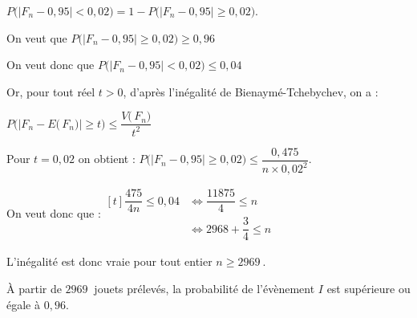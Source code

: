 \documentclass[10pt]{article}
\providecommand{\np}[2][]{{#2~#1}}
\begin{document}
\begin{enumerate}
\begin{enumerate}
$P\Big(\big|F_n - 0,95 \big| < 0,02\Big) = 1 - P\Big(\big|F_{n} - 0,95 \big| \geqslant 0,02\Big)$.

On veut que $P\Big(\big|F_{n} - 0,95 \big| \geqslant 0,02\Big) \geqslant 0,96$

On veut donc que $P\Big(\big|F_n - 0,95 \big| < 0,02\Big) \leqslant 0,04$

Or, pour tout réel $t > 0$, d'après l'inégalité de Bienaymé-Tchebychev, on a :

$P\Big(\big|F_n-E\big(\,F_n\big)\big| \geqslant t\Big) \leqslant \dfrac{V\big(\,F_n\big)}{t^2}$

Pour $t = 0,02$ on obtient : $ P\Big(\big|F_n-0,95\big| \geqslant 0,02\Big)\leqslant \dfrac{0,475}{ n \times 0,02^2}$.

On veut donc que :\quad $\begin{aligned}[t]
		\dfrac{475}{4 n} \leqslant 0,04 &\iff
		\dfrac{11875}{4} \leqslant n \\
		&\iff 2968+\dfrac{3}{4}\leqslant n
	\end{aligned}$

L'inégalité est donc vraie pour tout entier $n \geqslant \np{2969}$.

À partir de $\np{2969}$ jouets prélevés, la probabilité de l'évènement $I$ est supérieure ou égale à $0,96$.
	\end{enumerate}
\end{enumerate}

\medskip
\end{document}
